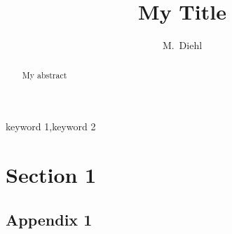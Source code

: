 \documentclass[3p,onecolumn]{elsarticle}
\begin{document}
\begin{frontmatter}

\title{My Title}

\author{M.~Diehl}

\address{Max-Planck-Institut f\"ur Eisenforschung, Max-Planck-Str.~1, 40237 D\"usseldorf, Germany}

\begin{abstract}
My abstract
\end{abstract}

\begin{keyword}
keyword 1\sep keyword 2
\end{keyword}

\end{frontmatter}

\tableofcontents


\section{Section 1}
\cite{EisenlohrEtAl2013}



\begin{appendices}
\section{Appendix 1}
\end{appendices}
\end{document}
